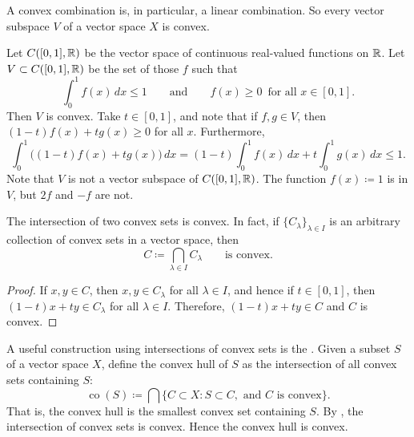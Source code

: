 \begin{example}
A convex combination is, in particular, a linear combination.
So every vector subspace $V$ of a vector space $X$ is convex.
\end{example}

\begin{example}
Let $C([0,1],{\mathbb{R}})$ be the vector space of continuous real-valued functions on ${\mathbb{R}}$.
Let $V \subset C([0,1],{\mathbb{R}})$ be the set of those $f$ such that
\begin{equation*}
\int_0^1 f(x)\,dx \leq 1 \qquad \text{and} \qquad
f(x) \geq 0 \enspace \text{for all } x \in [0,1] .
\end{equation*}
Then $V$ is convex.  Take $t \in [0,1]$, and note that if $f,g \in V$,
then $(1-t) f(x) + t g(x) \geq 0$ for all $x$.  Furthermore,
\begin{equation*}
\int_0^1 \bigl((1-t)f(x) + t g(x)\bigr) \,dx
=
(1-t) \int_0^1 f(x) \,dx
+ t \int_0^1 g(x) \,dx \leq 1 .
\end{equation*}
Note that $V$ is not a vector subspace of $C([0,1],{\mathbb{R}})$.  The function
$f(x) \coloneqq 1$ is in $V$, but $2f$ and $-f$ are not.
\end{example}

\begin{prop} \label{prop:intersectionconvex}
The intersection of two convex sets is convex.  In fact,
if $\{ C_\lambda \}_{\lambda \in I}$ is
an arbitrary collection of convex sets in a vector space, then
\begin{equation*}
C \coloneqq \bigcap_{\lambda \in I} C_\lambda
\qquad \text{is convex.}
\end{equation*}
\end{prop}

\begin{proof}
If $x, y \in C$, then $x,y \in C_\lambda$ for all
$\lambda \in I$, and hence if $t \in [0,1]$, then $(1-t)x + ty \in
C_\lambda$ for all $\lambda \in I$.  Therefore, $(1-t)x + ty \in C$ and $C$
is convex.
\end{proof}

A useful construction using intersections of convex sets is the
\emph{}.  Given a subset $S$ of a vector
space $X$, define the convex hull of $S$ as the intersection of all convex sets
containing $S$:
\begin{equation*}
\operatorname{co}(S) \coloneqq
\bigcap \{ C \subset X : S \subset C, \text{ and } C \text{ is convex} \} .
\end{equation*}
That is, the convex hull is the smallest convex set containing $S$.  
By , the intersection of convex sets is
convex.
Hence the convex hull is convex.

